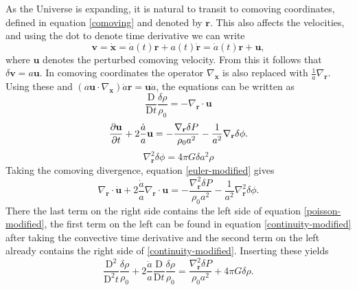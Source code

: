 \documentclass[english, twoside]{HYgradu}
\begin{document}
As the Universe is expanding, it is natural to transit to comoving coordinates, defined in equation \ref{comoving} and denoted by $\mathbf{r}$. This also affects the velocities, and using the dot to denote time derivative we can write
\begin{equation}
\mathbf{v} = \dot{\mathbf{x}} = \dot{a}(t)\mathbf{r} + a(t)\dot{\mathbf{r}} = \dot{a}(t)\mathbf{r} + \mathbf{u},
\end{equation}
where $\mathbf{u}$ denotes the perturbed comoving velocity. From this it follows that $\delta \mathbf{v} = a \mathbf{u}$. In comoving coordinates the operator $\nabla_\mathbf{x}$ is also replaced with $\frac{1}{a}\nabla_\mathbf{r}$. Using these and $(a\mathbf{u}\cdot\nabla_\mathbf{x})\dot{a}\mathbf{r}=\mathbf{u}\dot{a}$, the equations can be written as
\begin{equation}\label{continuity-modified}
\frac{\textrm{D}}{\textrm{D}t} \frac{\delta \rho}{\rho_0} = -\nabla_\mathbf{r} \cdot \mathbf{u}
\end{equation}
\begin{equation}\label{euler-modified}
\pdv{\mathbf{u}}{t} + 2 \frac{\dot a}{a}\mathbf{u} = - \frac{\nabla_\mathbf{r} \delta P}{\rho_0 a^2} - \frac{1}{a^2}\nabla_\mathbf{r} \delta \phi.
\end{equation}
\begin{equation}\label{poisson-modified}
\nabla_\mathbf{r}^2\delta \phi = 4 \pi G \delta a^2 \rho
\end{equation}
Taking the comoving divergence, equation \ref{euler-modified} gives
\begin{equation}
\nabla_\mathbf{r} \cdot \dot{\mathbf{u}} + 2 \frac{\dot a}{a}\nabla_\mathbf{r} \cdot \mathbf{u} = - \frac{\nabla_\mathbf{r}^2 \delta P}{\rho_0 a^2} - \frac{1}{a^2}\nabla_\mathbf{r}^2 \delta \phi.
\end{equation}
There the last term on the right side contains the left side of equation \ref{poisson-modified}, the first term on the left can be found in equation \ref{continuity-modified} after taking the convective time derivative and the second term on the left already contains the right side of \ref{continuity-modified}. Inserting these yields
\begin{equation}\label{euler-insertions1}
\frac{\textrm{D}^2}{\textrm{D}^2 t} \frac{\delta \rho}{\rho_0} + 2 \frac{\dot a}{a} \frac{\textrm{D}}{\textrm{D} t} \frac{\delta \rho}{\rho_0} = \frac{\nabla_\mathbf{r}^2 \delta P}{\rho_0 a^2} + 4 \pi G \delta \rho.
\end{equation}
\end{document}
